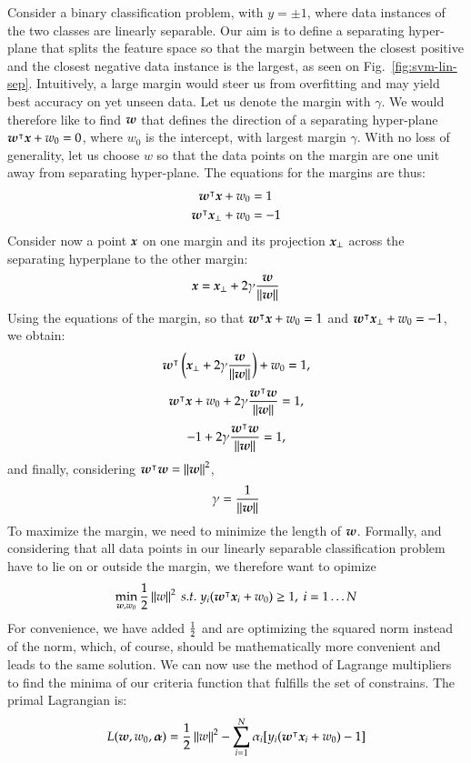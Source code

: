 \begin{refsection}
Consider a binary classification problem, with $y=\pm 1$, where data instances of the two classes are linearly separable. Our aim is to define a separating hyper-plane that splits the feature space so that the margin between the closest positive and the closest negative data instance is the largest, as seen on Fig.~\ref{fig:svm-lin-sep}. Intuitively, a large margin would steer us from overfitting and may yield best accuracy on yet unseen data. Let us denote the margin with $\gamma$. We would therefore like to find $\boldsymbol{w}$ that defines the direction of a separating hyper-plane $\boldsymbol{w}^\intercal\boldsymbol{x}+w_0=0$, where $w_0$ is the intercept, with largest margin $\gamma$. With no loss of generality, let us choose $w$ so that the data points on the margin are one unit away from separating hyper-plane. The equations for the margins are thus:
\begin{align*}
\boldsymbol{w}^\intercal\boldsymbol{x}+w_0 &= 1 \\
\boldsymbol{w}^\intercal\boldsymbol{x}_\perp+w_0 &= -1 \\
\end{align*}
Consider now a point $\boldsymbol{x}$ on one margin and its projection $\boldsymbol{x}_\perp$ across the separating hyperplane to the other margin:
$$ \boldsymbol{x} = \boldsymbol{x}_\perp + 2\gamma {\boldsymbol{w}\over\left\lVert\boldsymbol{w}\right\rVert} $$
Using the equations of the margin, so that $\boldsymbol{w}^\intercal\boldsymbol{x}+w_0 = 1$ and $\boldsymbol{w}^\intercal\boldsymbol{x}_\perp+w_0 = -1$, we obtain:
$$ \boldsymbol{w}^\intercal\left(\boldsymbol{x}_\perp + 2\gamma {\boldsymbol{w}\over\left\lVert\boldsymbol{w}\right\rVert}\right) + w_0=1, $$
$$ \boldsymbol{w}^\intercal\boldsymbol{x} + w_0 + 2\gamma {\boldsymbol{w}^\intercal\boldsymbol{w}\over\left\lVert\boldsymbol{w}\right\rVert}
= 1, $$
$$ -1 + 2\gamma {\boldsymbol{w}^\intercal\boldsymbol{w}\over\left\lVert\boldsymbol{w}\right\rVert}
= 1, $$
and finally, considering $\boldsymbol{w}^\intercal\boldsymbol{w}=\left\lVert\boldsymbol{w}\right\rVert^2 $,
$$ \gamma = {1\over\left\lVert\boldsymbol{w}\right\rVert} $$
To maximize the margin, we need to minimize the length of $\boldsymbol{w}$. Formally, and considering that all data points in our linearly separable classification problem have to lie on or outside the margin, we therefore want to opimize
$$\min_{\vect{w},w_0} {1\over 2}\norm{w}^2\ s.t.\ y_i(\vect{w}^\tr \vect{x}_i+w_0)\geq 1,\ i=1\ldots N$$
For convenience, we have added $1\over 2$ and are optimizing the squared norm instead of the norm, which, of course, should be mathematically more convenient and leads to the same solution. We can now use the method of Lagrange multipliers to find the minima of our criteria function that fulfills the set of constrains. The primal Lagrangian is:
$$ L(\boldsymbol{w},w_0,\boldsymbol{\alpha})={1\over 2}\left\lVert w\right\rVert^2 - \sum_{i=1}^N \alpha_i [y_i(\boldsymbol{w}^\intercal \boldsymbol{x}_i+w_0)-1] $$

\end{refsection}
